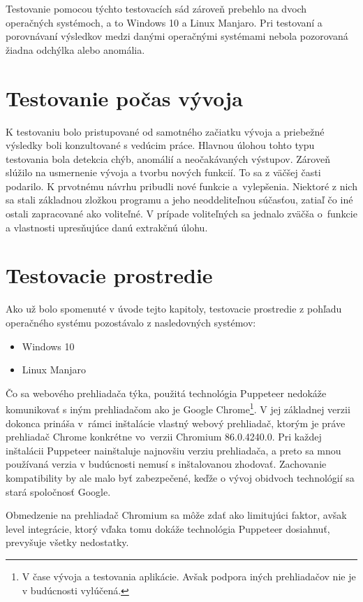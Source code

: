 Testovanie pomocou týchto testovacích sád zároveň prebehlo na dvoch operačných systémoch, a to Windows 10 a Linux Manjaro. Pri testovaní a porovnávaní výsledkov medzi danými operačnými systémami nebola pozorovaná žiadna odchýlka alebo anomália. 

\section{Testovanie počas vývoja}

K testovaniu bolo pristupované od samotného začiatku vývoja a priebežné výsledky boli konzultované s vedúcim práce. Hlavnou úlohou tohto typu testovania bola detekcia chýb, anomálií a neočakávaných výstupov. Zároveň slúžilo na usmernenie vývoja a tvorbu nových funkcií. To sa z väčšej časti podarilo. K prvotnému návrhu pribudli nové funkcie a~vylepšenia. Niektoré z nich sa stali základnou zložkou programu a jeho neoddeliteľnou súčasťou, zatiaľ čo iné ostali zapracované ako voliteľné. V prípade voliteľných sa jednalo zväčša o~funkcie a vlastnosti upresňujúce danú extrakčnú úlohu.

\section{Testovacie prostredie}

Ako už bolo spomenuté v úvode tejto kapitoly, testovacie prostredie z pohľadu operačného systému pozostávalo z nasledovných systémov:

\begin{itemize}
    \item Windows 10
    \item Linux Manjaro
\end{itemize}

\newpage

Čo sa webového prehliadača týka, použitá technológia Puppeteer nedokáže komunikovať s iným prehliadačom ako je Google Chrome\footnote{V čase vývoja a testovania aplikácie. Avšak podpora iných prehliadačov nie je v budúcnosti vylúčená.}. V jej základnej verzii dokonca prináša v~rámci inštalácie vlastný webový prehliadač, ktorým je práve prehliadač Chrome konkrétne vo~verzii Chromium 86.0.4240.0. Pri každej inštalácii Puppeteer nainštaluje najnovšiu verziu prehliadača, a preto sa mnou používaná verzia v budúcnosti nemusí s inštalovanou zhodovať. Zachovanie kompatibility by ale malo byť zabezpečené, keďže o vývoj obidvoch technológií sa stará spoločnosť Google.

Obmedzenie na prehliadač Chromium sa môže zdať ako limitujúci faktor, avšak level integrácie, ktorý vďaka tomu dokáže technológia Puppeteer dosiahnuť, prevyšuje všetky nedostatky.

